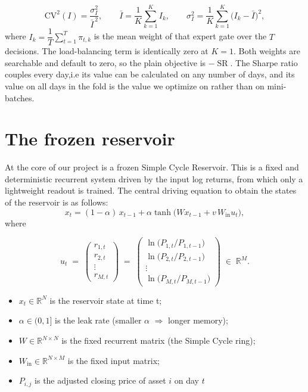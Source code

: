 \begin{equation}
  \mathrm{CV}^2(I) = \frac{\sigma_I^2}{\bar{I}^{\,2}},
  \qquad
  \bar{I} = \frac{1}{K}\sum_{k=1}^{K} I_k,
  \qquad
  \sigma_I^2 = \frac{1}{K}\sum_{k=1}^{K}\big(I_k - \bar{I}\big)^2,
\end{equation}
where $I_k = \dfrac{1}{T}\sum_{t=1}^{T}\pi_{t,k}$ is the mean weight of that expert gate over the $T$ decisions. The load-balancing term is identically zero at $K = 1$. Both weights are searchable and default to zero, so the plain objective is $-\operatorname{SR}$.
The Sharpe ratio couples every day,i.e its value can be calculated on any number of days, and its value on all days in the fold is the value we optimize on rather than on mini-batches.

\section{The frozen reservoir}
\label{sec:reservoir}

At the core of our project is a frozen Simple Cycle Reservoir. This is a  fixed and deterministic recurrent system driven by the input log returns, from which only a lightweight readout is trained. The central driving equation to obtain the states of the reservoir is as follows:
\begin{equation}
  x_t = (1-\alpha)\, x_{t-1} + \alpha \tanh\!\big(W x_{t-1} + v\, W_{\text{in}} u_t\big),
  \label{eq:reservoir}
\end{equation}
where 

\begin{equation}
  u_t \;=\;
  \begin{pmatrix} r_{1,t} \\ r_{2,t} \\ \vdots \\ r_{M,t} \end{pmatrix}
  \;=\;
  \begin{pmatrix}
    \ln\!\big(P_{1,t}/P_{1,t-1}\big) \\[2pt]
    \ln\!\big(P_{2,t}/P_{2,t-1}\big) \\[2pt]
    \vdots \\[2pt]
    \ln\!\big(P_{M,t}/P_{M,t-1}\big)
  \end{pmatrix}
  \;\in\; \mathbb{R}^{M}.
  \label{eq:reservoir-input}
\end{equation}

\begin{itemize}
  \item $x_t \in \mathbb{R}^{N}$ is the reservoir state at time t;
  \item $\alpha \in (0,1]$ is the leak rate (smaller $\alpha$ $\Rightarrow$ longer memory);
  \item $W \in \mathbb{R}^{N\times N}$ is the fixed recurrent matrix (the Simple Cycle ring);
  \item $W_{\mathrm{in}} \in \mathbb{R}^{N\times M}$ is the fixed input matrix;
  \item $P_{i,j}$ is the adjusted closing price of asset $i$ on day $t$
\end{itemize}

